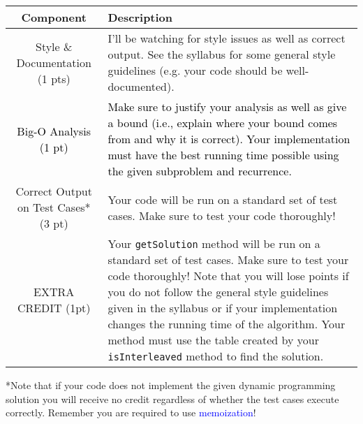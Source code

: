 \documentclass[11pt,answers]{exam}
\begin{document}
\begin{center}
  \begin{tabular}{| c | p{9cm} |}
	\hline
	Component & Description 	\\
    \hline
    Style \& Documentation  (1 pts) & I'll be watching for style issues as well as correct output.  See the syllabus for some general style guidelines (e.g. your code should be well-documented). 
		\\ \hline
		\textcolor{black}{Big-O Analysis (1 pt)} & \textcolor{black}{Make sure to justify your analysis as well as give a bound (i.e., explain where your bound comes from and why it is correct).  Your implementation must have the best running time possible using the given subproblem and recurrence.}\\
		\hline
 Correct Output on Test Cases* (3 pt) & Your code will be run on a standard set of test cases.  Make sure to test your code thoroughly! \\ \hline
	EXTRA CREDIT (1pt) & Your \texttt{getSolution} method will be run on a standard set of test cases.  Make sure to test your code thoroughly!  Note that you will lose points if you do not follow the general style guidelines given in the syllabus or if your implementation changes the running time of the algorithm. Your method must use the table created by your \texttt{isInterleaved} method to find the solution. \\ \hline
  \end{tabular}
\end{center}
*Note that if your code does not implement the given dynamic programming solution you will receive no credit regardless of whether the test cases execute correctly.  Remember you are required to use \textcolor{blue}{memoization}!
\end{document}
